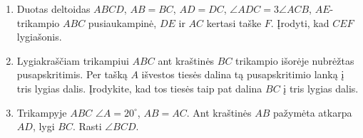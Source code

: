 \begin{enumerate}
\item Duotas deltoidas $ABCD$, $AB=BC$, $AD=DC$, $\angle
  ADC=3\angle ACB$, $AE$-trikampio $ABC$ pusiaukampinė, $DE$
  ir $AC$ kertasi taške $F$. Įrodyti, kad $CEF$ lygiašonis.
\item Lygiakraščiam trikampiui $ABC$ ant kraštinės $BC$
  trikampio išorėje nubrėžtas pusapskritimis. Per tašką $A$
  išvestos tiesės dalina tą pusapskritimio lanką į tris
  lygias dalis. Įrodykite, kad tos tiesės taip pat dalina
  $BC$ į tris lygias dalis.
\item Trikampyje $ABC$ $\angle A=20^\circ$, $AB=AC$. Ant
  kraštinės $AB$ pažymėta atkarpa $AD$, lygi $BC$. Rasti
  $\angle BCD$. 

\end{enumerate}
